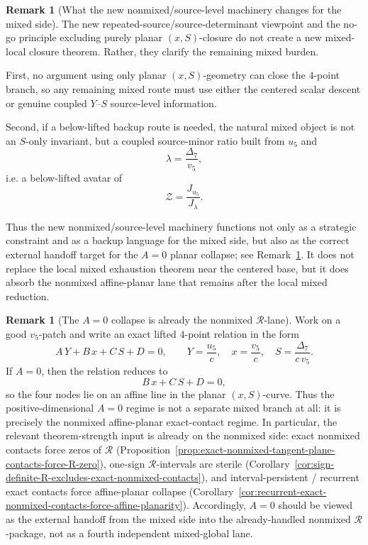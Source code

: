 \documentclass[11pt,a4paper]{amsart}
\theoremstyle{plain}
\theoremstyle{definition}
\newtheorem{remark}[theorem]{Remark}
\begin{document}
\begin{remark}[What the new nonmixed/source-level machinery changes for the mixed side]
\label{rem:nonmixed-source-machinery-mixed-side}
The new repeated-source/source-determinant viewpoint and the no-go principle
excluding purely planar $(x,S)$-closure do not create a new mixed-local closure
theorem. Rather, they clarify the remaining mixed burden.

First, no argument using only planar $(x,S)$-geometry can close the $4$-point
branch, so any remaining mixed route must use either the centered scalar
descent or genuine coupled $Y$--$S$ source-level information.

Second, if a below-lifted backup route is needed, the natural mixed object is
not an $S$-only invariant, but a coupled source-minor ratio built from
$u_5$ and
\[
\lambda=\frac{\Delta_7}{v_5},
\]
i.e. a below-lifted avatar of
\[
\mathcal Z=\frac{J_{u_5}}{J_\lambda}.
\]

Thus the new nonmixed/source-level machinery functions not only as a strategic
constraint and as a backup language for the mixed side, but also as the
correct external handoff target for the $A=0$ planar collapse; see
Remark~\ref{rem:A-zero-is-nonmixed-handoff}. It does not replace the local
mixed exhaustion theorem near the centered base, but it does absorb the
nonmixed affine-planar lane that remains after the local mixed reduction.
\end{remark}

\begin{remark}[The $A=0$ collapse is already the nonmixed $\mathcal R$-lane]
\label{rem:A-zero-is-nonmixed-handoff}
Work on a good $v_5$-patch and write an exact lifted $4$-point relation in the
form
\[
A\,Y+B\,x+C\,S+D=0,
\qquad
Y=\frac{u_5}{c},\quad x=\frac{v_5}{c},\quad S=\frac{\Delta_7}{c\,v_5}.
\]
If $A=0$, then the relation reduces to
\[
B\,x+C\,S+D=0,
\]
so the four nodes lie on an affine line in the planar $(x,S)$-curve. Thus the
positive-dimensional $A=0$ regime is not a separate mixed branch at all: it is
precisely the nonmixed affine-planar exact-contact regime. In particular, the
relevant theorem-strength input is already on the nonmixed side: exact
nonmixed contacts force zeros of $\mathcal R$
(Proposition~\ref{prop:exact-nonmixed-tangent-plane-contacts-force-R-zero}),
one-sign $\mathcal R$-intervals are sterile
(Corollary~\ref{cor:sign-definite-R-excludes-exact-nonmixed-contacts}), and
interval-persistent / recurrent exact contacts force affine-planar collapse
(Corollary~\ref{cor:recurrent-exact-nonmixed-contacts-force-affine-planarity}).
Accordingly, $A=0$ should be viewed as the external handoff from the mixed side
into the already-handled nonmixed $\mathcal R$-package, not as a fourth
independent mixed-global lane.
\end{remark}
\end{document}
